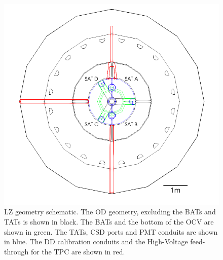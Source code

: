 \begin{figure}[]
\includegraphics[width=\textwidth]{Figures/Geometry/geometry_with_conduits_with_scale.png}
\centering
\caption{LZ geometry schematic. The OD geometry, excluding the BATs and TATs is shown in black. The BATs and the bottom of the OCV are shown in green. The TATs, CSD ports and PMT conduits are shown in blue. The DD calibration conduits and the High-Voltage feed-through for the TPC are shown in red.}
\label{fig:OD_conduit_geometry}
\end{figure}





